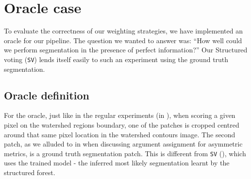 \section[Oracle case]{Oracle case}
\label{sec:ch5-oracle}
To evaluate the correctness of our weighting strategies, we have implemented an oracle for our pipeline. 
The question we wanted to answer was: ``How well could we perform segmentation in the presence of perfect information?''
Our Structured voting ({\tt SV}) lends itself easily to such an experiment using the ground truth segmentation. 

\subsection{Oracle definition}
For the oracle, just like in the regular experiments (in ), when scoring a given pixel on the watershed regions boundary, one of the patches is cropped centred around that same pixel location in the watershed contours image. The second patch, as we alluded to in  when discussing argument assignment for asymmetric metrics, is a ground truth segmentation patch. This is different from {\tt SV} (), which uses the trained model - the inferred most likely segmentation learnt by the structured forest.


